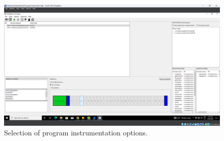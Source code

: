 \documentclass[conference]{IEEEtran}
\begin{document}
\begin{figure}[htbp]
    \centerline{\includegraphics[width=1.0\columnwidth]{images/sch_s10.png}}
    \caption{Selection of program instrumentation options.}
    \label{figure:ap_sch_s10}
\end{figure}
\end{document}
